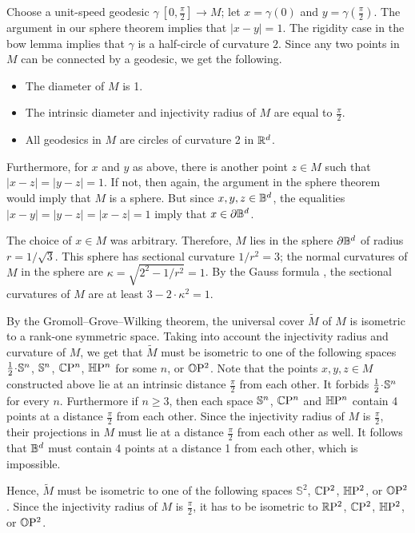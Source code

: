 \documentclass[a4paper,10pt]{article}
\begin{document}
Choose a unit-speed geodesic $\gamma\:[0,\tfrac\pi2]\to M$;
let $x=\gamma(0)$ and $y=\gamma(\tfrac\pi2)$.
The argument in our sphere theorem implies that $|x-y|=1$.
The rigidity case in the bow lemma implies that $\gamma$ is a half-circle of curvature $2$.
Since any two points in $M$ can be connected by a geodesic, we get the following.
\begin{itemize}
 \item The diameter of $M$ is 1.
 \item The intrinsic diameter and injectivity radius of $M$ are equal to $\tfrac\pi2$.
 \item All geodesics in $M$ are circles of curvature 2 in $\mathbb{R}^d$.
\end{itemize}

Furthermore, for $x$ and $y$ as above,
there is another point $z\in M$ such that $|x-z|=|y-z|=1$.
If not, then again, the argument in the sphere theorem would imply that $M$ is a sphere.
But since $x,y,z\in\mathbb{B}^d$,
the equalities $|x-y|=|y-z|=|x-z|=1$ imply that $x\in \partial \mathbb{B}^d$.

The choice of $x\in M$ was arbitrary.
Therefore, $M$ lies in the sphere $\partial \mathbb{B}^d$ of radius $r=1/\sqrt{3}$.
This sphere has sectional curvature $1/r^2=3$;
the normal curvatures of $M$ in the sphere are $\kappa=\sqrt{2^2-1/r^2}=1$.
By the Gauss formula \cite[Lemma 5]{petrunin2024}, the sectional curvatures of $M$ are at least $3-2\cdot \kappa^2=1$.

By the Gromoll--Grove--Wilking theorem, the universal cover $\tilde M$ of $M$ is isometric to a rank-one symmetric space.
Taking into account the injectivity radius and curvature of $M$, we get that $\tilde M$ must be isometric to one of the following spaces
$\tfrac12\cdot \SSS^n$, $\mathbb{S}^n$, $\mathbb{C}\mathrm{P}^n$, $\mathbb{H}\mathrm{P}^n$ for some $n$, or $\mathbb{O}\mathrm{P}^2$.
Note that the points $x,y,z\in M$ constructed above lie at an intrinsic distance $\tfrac\pi2$ from each other.
It forbids $\tfrac12\cdot \SSS^n$ for every $n$.
Furthermore if $n\ge 3$, then each space  $\mathbb{S}^n$, $\mathbb{C}\mathrm{P}^n$ and $\mathbb{H}\mathrm{P}^n$ contain 4 points at a distance $\tfrac\pi2$ from each other.
Since the injectivity radius of $M$ is $\tfrac\pi2$, their projections in $M$ must lie at a distance $\tfrac\pi2$ from each other as well.
It follows that $\mathbb{B}^d$ must contain 4 points at a distance 1 from each other, which is impossible.

Hence, $\tilde M$ must be isometric to one of the following spaces $\mathbb{S}^2$, $\mathbb{C}\mathrm{P}^2$, $\mathbb{H}\mathrm{P}^2$, or $\mathbb{O}\mathrm{P}^2$.
Since the injectivity radius of $M$ is $\tfrac\pi2$, 
it has to be isometric to $\mathbb{R}\mathrm{P}^2$, $\mathbb{C}\mathrm{P}^2$, $\mathbb{H}\mathrm{P}^2$, or $\mathbb{O}\mathrm{P}^2$.
\end{document}
